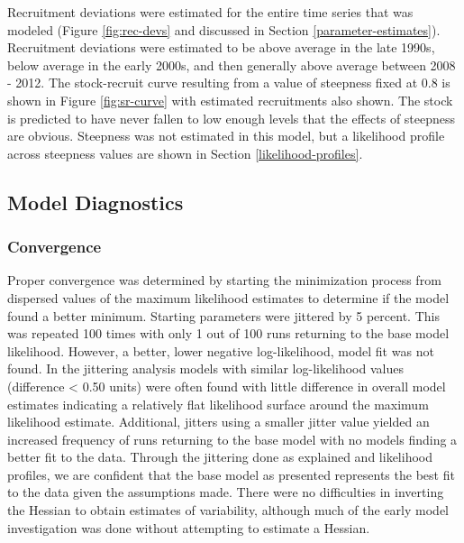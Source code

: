 \documentclass[11pt,
  english,
  a4paper,
]{article}
\begin{document}
Recruitment deviations were estimated for the entire time series that was modeled (Figure \ref{fig:rec-devs} and discussed in Section \ref{parameter-estimates}). Recruitment deviations were estimated to be above average in the late 1990s, below average in the early 2000s, and then generally above average between 2008 - 2012. The stock-recruit curve resulting from a value of steepness fixed at 0.8 is shown in Figure \ref{fig:sr-curve} with estimated recruitments also shown. The stock is predicted to have never fallen to low enough levels that the effects of steepness are obvious. Steepness was not estimated in this model, but a likelihood profile across steepness values are shown in Section \ref{likelihood-profiles}.

\leavevmode\tagmcend\tagstructend\par


\hypertarget{model-diagnostics}{%
\subsection{Model Diagnostics}\label{model-diagnostics}}

\leavevmode\tagmcend\tagstructend


\hypertarget{convergence}{%
\subsubsection{Convergence}\label{convergence}}

\leavevmode\tagmcend\tagstructend


Proper convergence was determined by starting the minimization process from dispersed values of the maximum likelihood estimates to determine if the model found a better minimum. Starting parameters were jittered by 5 percent. This was repeated 100 times with only 1 out of 100 runs returning to the base model likelihood. However, a better, lower negative log-likelihood, model fit was not found. In the jittering analysis models with similar log-likelihood values (difference \textless{} 0.50 units) were often found with little difference in overall model estimates indicating a relatively flat likelihood surface around the maximum likelihood estimate. Additional, jitters using a smaller jitter value yielded an increased frequency of runs returning to the base model with no models finding a better fit to the data. Through the jittering done as explained and likelihood profiles, we are confident that the base model as presented represents the best fit to the data given the assumptions made. There were no difficulties in inverting the Hessian to obtain estimates of variability, although much of the early model investigation was done without attempting to estimate a Hessian.
\end{document}
